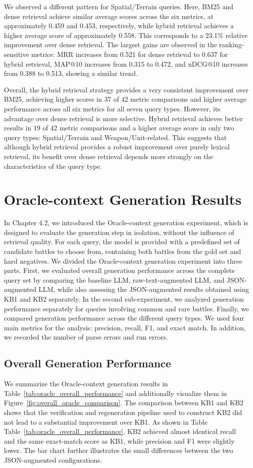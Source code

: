 We observed a different pattern for Spatial/Terrain queries. Here, BM25 and dense retrieval achieve similar average scores across the six metrics, at approximately 0.459 and 0.453, respectively, while hybrid retrieval achieves a higher average score of approximately 0.558. This corresponds to a 23.1\% relative improvement over dense retrieval. The largest gains are observed in the ranking-sensitive metrics: MRR increases from 0.521 for dense retrieval to 0.637 for hybrid retrieval, MAP@10 increases from 0.315 to 0.472, and nDCG@10 increases from 0.388 to 0.513, showing a similar trend.

Overall, the hybrid retrieval strategy provides a very consistent improvement over BM25, achieving higher scores in 37 of 42 metric comparisons and higher average performance across all six metrics for all seven query types. However, its advantage over dense retrieval is more selective. Hybrid retrieval achieves better results in 19 of 42 metric comparisons and a higher average score in only two query types: Spatial/Terrain and Weapon/Unit-related. This suggests that although hybrid retrieval provides a robust improvement over purely lexical retrieval, its benefit over dense retrieval depends more strongly on the characteristics of the query type.
\section{Oracle-context Generation Results}
In Chapter 4.2, we introduced the Oracle-context generation experiment, which is designed to evaluate the generation step in isolation, without the influence of retrieval quality. For each query, the model is provided with a predefined set of candidate battles to choose from, containing both battles from the gold set and hard negatives. We divided the Oracle-context generation experiment into three parts. First, we evaluated overall generation performance across the complete query set by comparing the baseline LLM, raw-text-augmented LLM, and JSON-augmented LLM, while also assessing the JSON-augmented results obtained using KB1 and KB2 separately. In the second sub-experiment, we analyzed generation performance separately for queries involving common and rare battles. Finally, we compared generation performance across the different query types. We used four main metrics for the analysis: precision, recall, F1, and exact match. In addition, we recorded the number of parse errors and run errors.
\subsection{Overall Generation Performance}
We summarize the Oracle-context generation results in Table~\ref{tab:oracle_overall_performance} and additionally visualize them in Figure~\ref{fig:overall_oracle_comparison}. The comparison between KB1 and KB2 shows that the verification and regeneration pipeline used to construct KB2 did not lead to a substantial improvement over KB1. As shown in Table Table~\ref{tab:oracle_overall_performance}, KB2 achieved almost identical recall and the same exact-match score as KB1, while precision and F1 were slightly lower. The bar chart further illustrates the small differences between the two JSON-augmented configurations.

